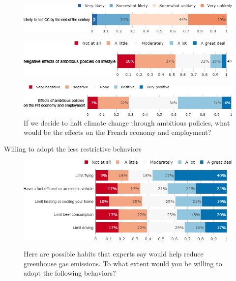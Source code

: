 \begin{framefont}{\small}
\begin{frame}{}%
\begin{figure}[h!]
\centering
\caption{How likely is it that human kind halt climate change by the end of the century?}
\includegraphics[width=.61\paperwidth]{../figures/FR/CC_will_end_FR.png}\\
\caption{If we decide to halt climate change through ambitious policies, to what extent do you think it would negatively affect your lifestyle?}
\includegraphics[width=.61\paperwidth]{../figures/FR/effect_halt_CC_lifestyle_FR.png} \\
\caption{If we decide to halt climate change through ambitious policies, what would be the effects on the French economy and employment?} %
\includegraphics[width=.61\paperwidth]{../figures/FR/effect_halt_CC_economy_FR.png}
\end{figure}
\end{frame}

\begin{frame}{Willing to adopt the less restrictive behaviors}%
\begin{figure}[h!]
\centering
\caption{Here are possible habits that experts say would help reduce greenhouse gas emissions.
To what extent would you be willing to adopt the following behaviors?}
\includegraphics[width=.7\paperwidth]{../figures/FR/willing_FR.png} \\
\end{figure}
\end{frame}


\end{framefont}
